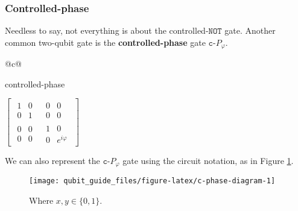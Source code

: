 \documentclass[fleqn]{article}
\newenvironment{idea}{\noindent}{\medskip}
\begin{document}
\hypertarget{controlled-phase}{%
\subsubsection{Controlled-phase}\label{controlled-phase}}

Needless to say, not everything is about the controlled-\(\texttt{NOT}\) gate.
Another common two-qubit gate is the \textbf{controlled-phase} gate \(\texttt{c-}P_\varphi\).

\begin{idea}

\begin{longtable}[]{@{}c@{}}
\toprule
\begin{minipage}[b]{0.97\columnwidth}\centering
controlled-phase\strut
\end{minipage}\tabularnewline
\midrule
\endhead
\begin{minipage}[t]{0.97\columnwidth}\centering
\(\left[\begin{array}{c|c}\begin{matrix}1&0\\0&1\end{matrix}&\begin{matrix}0&0\\0&0\end{matrix}\\\hline\begin{matrix}0&0\\0&0\end{matrix}&\begin{matrix}1&0\\0&e^{i\varphi}\end{matrix}\end{array}\right]\)\strut
\end{minipage}\tabularnewline
\bottomrule
\end{longtable}


\end{idea}

We can also represent the \(\texttt{c-}P_\varphi\) gate using the circuit notation, as in Figure \ref{fig:c-phase-diagram}.



\begin{figure}[H]

{\centering \texttt{[image: qubit\_guide\_files/figure-latex/c-phase-diagram-1]} 

}

\caption{Where \(x,y\in\{0,1\}\).}\label{fig:c-phase-diagram}
\end{figure}
\end{document}

